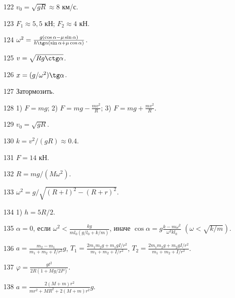 \begin{Answer}{122}
$v_0 = \sqrt{gR} \approx 8$ км/с.
\end{Answer}
\begin{Answer}{123}
$F_1 \approx 5,5$ кН; $F_2 \approx 4$ кН.
\end{Answer}
\begin{Answer}{124}
$\omega^2 = \frac{g(\cos \alpha - \mu \sin \alpha)}{h \tg \alpha (\sin \alpha + \mu \cos \alpha)}$.
\end{Answer}
\begin{Answer}{125}
$v = \sqrt{Rg \ctg \alpha}$.
\end{Answer}
\begin{Answer}{126}
$x = (g/\omega^2) \tg \alpha$.
\end{Answer}
\begin{Answer}{127}
Затормозить.
\end{Answer}
\begin{Answer}{128}
1) $F=mg$; 2) $F=mg-\frac{mv^2}{R}$; 3) $F=mg+\frac{mv^2}{R}$.
\end{Answer}
\begin{Answer}{129}
$v_0 = \sqrt{gR}$.
\end{Answer}
\begin{Answer}{130}
$k=v^2/(gR) \approx 0.4$.
\end{Answer}
\begin{Answer}{131}
$F = 14$ кН.
\end{Answer}
\begin{Answer}{132}
$R = mg/(M\omega^2)$.
\end{Answer}
\begin{Answer}{133}
$\omega^2 = g/\sqrt{(R+l)^2-(R+r)^2}$.
\end{Answer}
\begin{Answer}{134}
1) $h=5R/2$.
\end{Answer}
\begin{Answer}{135}
$\alpha = 0$, если $\omega^2 < \frac{kg}{ml_0(g/l_0 + k/m)}$, иначе $\cos \alpha = g\frac{k-m\omega^2}{\omega^2kl_0}$ $\left( \omega < \sqrt{k/m} \right)$.
\end{Answer}
\begin{Answer}{136}
$a= \frac{m_2-m_1}{m_1+m_2+I/r^2}g$, $T_1 = \frac{2m_1m_2g + m_1gI/r^2}{m_1+m_2+I/r^2}$, $T_2 = \frac{2m_1m_2g + m_2gI/r^2}{m_1+m_2+I/r^2}$.
\end{Answer}
\begin{Answer}{137}
$\varphi = \frac{gt^2}{2R(1+Mg/2P)}$.
\end{Answer}
\begin{Answer}{138}
$a = \frac{2(M+m)r^2}{mr^2+MR^2+2(M+m)r^2}g$.
\end{Answer}
